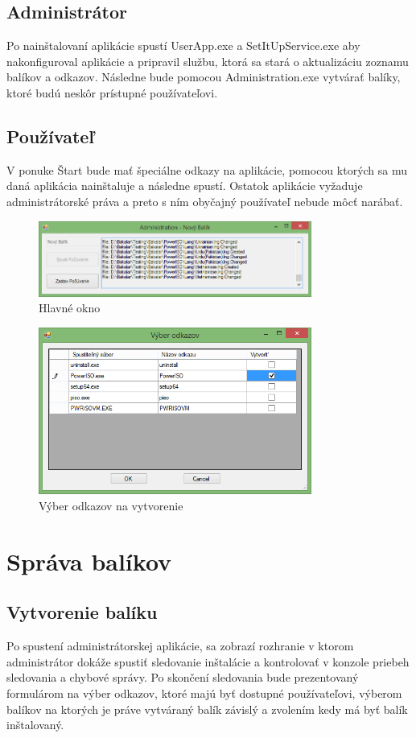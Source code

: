 \subsection{Administrátor}
Po nainštalovaní aplikácie spustí UserApp.exe a SetItUpService.exe aby nakonfiguroval aplikácie a pripravil službu, ktorá sa stará o aktualizáciu zoznamu balíkov a odkazov. Následne bude pomocou Administration.exe vytvárať balíky, ktoré budú neskôr prístupné používateľovi.

\subsection{Používateľ}
V ponuke Štart bude mať špeciálne odkazy na aplikácie, pomocou ktorých sa mu daná aplikácia nainštaluje a následne spustí. Ostatok aplikácie vyžaduje administrátorské práva a preto s ním obyčajný používateľ nebude môcť narábať.
\begin{figure}[h]
    \centering
    \includegraphics[width=0.8\textwidth]{hlavne}
    \caption{Hlavné okno}
    \label{fig:hlavne}
\end{figure}
\begin{figure}[h]
    \centering
    \includegraphics[width=0.8\textwidth]{odkazy}
    \caption{Výber odkazov na vytvorenie}
    \label{fig:links}
\end{figure}

\section{Správa balíkov}
\subsection{Vytvorenie balíku}
Po spustení administrátorskej aplikácie, sa zobrazí rozhranie v ktorom administrátor dokáže spustiť sledovanie inštalácie a kontrolovať v konzole priebeh sledovania a chybové správy. Po skončení sledovania bude prezentovaný formulárom na výber odkazov, ktoré majú byť dostupné používateľovi, výberom balíkov na ktorých je práve vytváraný balík závislý a zvolením kedy má byť balík inštalovaný.

